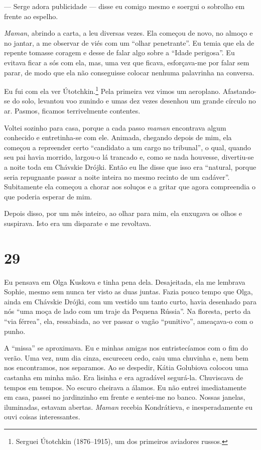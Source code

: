 --- Serge adora publicidade --- disse eu comigo mesmo e soergui o
sobrolho em frente ao espelho.

\emph{Maman}, abrindo a carta, a leu diversas vezes. Ela começou de
novo, no almoço e no jantar, a me observar de viés com um ``olhar
penetrante''. Eu temia que ela de repente tomasse coragem e desse de
falar algo sobre a ``Idade perigosa''. Eu evitava ficar a sós com ela,
mas, uma vez que ficava, esforçava-me por falar sem parar, de modo que
ela não conseguisse colocar nenhuma palavrinha na conversa.

Eu fui com ela ver Útotchkin.\footnote{Serguei Útotchkin (1876--1915),
  um dos primeiros aviadores russos.} Pela primeira vez vimos um
aeroplano. Afastando-se do solo, levantou voo zunindo e umas dez vezes
desenhou um grande círculo no ar. Pasmos, ficamos terrivelmente
contentes.

Voltei sozinho para casa, porque a cada passo \emph{maman} encontrava
algum conhecido e entretinha-se com ele. Animada, chegando depois de
mim, ela começou a repreender certo ``candidato a um cargo no
tribunal'', o qual, quando seu pai havia morrido, largou-o lá trancado
e, como se nada houvesse, divertiu-se a noite toda em Chávskie Drójki.
Então eu lhe disse que isso era ``natural, porque seria repugnante
passar a noite inteira no mesmo recinto de um cadáver''. Subitamente ela
começou a chorar aos soluços e a gritar que agora compreendia o que
poderia esperar de mim.

Depois disso, por um mês inteiro, ao olhar para mim, ela enxugava os
olhos e suspirava. Isto era um disparate e me revoltava.

\section{29}

Eu pensava em Olga Kuskova e tinha pena dela. Desajeitada, ela me
lembrava Sophie, mesmo sem nunca ter visto as duas juntas. Fazia pouco
tempo que Olga, ainda em Chávskie Drójki, com um vestido um tanto curto,
havia desenhado para nós ``uma moça de lado com um traje da Pequena
Rússia''. Na floresta, perto da ``via férrea'', ela, ressabiada, ao ver
passar o vagão ``punitivo'', ameaçava-o com o punho.

A ``missa'' se aproximava. Eu e minhas amigas nos entristecíamos com o
fim do verão. Uma vez, num dia cinza, escureceu cedo, caiu uma chuvinha
e, nem bem nos encontramos, nos separamos. Ao se despedir, Kátia
Golubiova colocou uma castanha em minha mão. Era lisinha e era agradável
segurá-la. Chuviscava de tempos em tempos. No escuro cheirava a álamos.
Eu não entrei imediatamente em casa, passei no jardinzinho em frente e
sentei-me no banco. Nossas janelas, iluminadas, estavam abertas.
\emph{Maman} recebia Kondrátieva, e inesperadamente eu ouvi coisas
interessantes.

